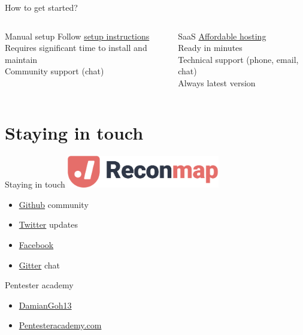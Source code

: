 \documentclass{beamer}
\begin{document}
\begin{frame}{How to get started?}
    \begin{columns}[T]
        \begin{column}{.45\textwidth}
            \begin{block}{Manual setup}
            Follow \href{https://github.com/reconmap/reconmap\#readme}{setup instructions}\\
			\bigskip
            Requires significant time to install and maintain\\
            Community support (chat)
            \end{block}
        \end{column}
        \begin{column}{.45\textwidth}
            \begin{block}{SaaS}
            \href{https://reconmap.com}{Affordable hosting}\\
            \bigskip
            Ready in minutes\\
            Technical support (phone, email, chat)\\
            Always latest version            
            \end{block}
        \end{column}
    \end{columns}
    
\end{frame}

\section{Staying in touch}

\begin{frame}{Staying in touch}
	\includegraphics[width=0.5\textwidth]{images/reconmap-logo.png}	
    \begin{itemize}
        \item \href{https://github.com/reconmap}{Github} community
        \item \href{https://twitter.com/reconmap}{Twitter} updates
        \item \href{https://facebook.com/reconmap}{Facebook}
        \item \href{https://gitter.im/reconmap/community}{Gitter} chat
    \end{itemize}
    \bigskip
	Pentester academy
    \begin{itemize}
        \item \href{https://twitter.com/DamianGoh13}{DamianGoh13}
        \item \href{https://www.pentesteracademy.com/}{Pentesteracademy.com}
    \end{itemize}
\end{frame}
\end{document}
